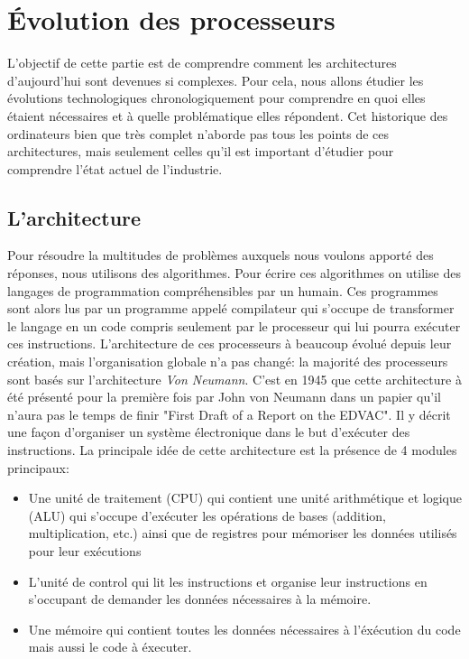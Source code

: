 \section{Évolution des processeurs}

L'objectif de cette partie est de comprendre comment les architectures d'aujourd'hui sont devenues si complexes. Pour cela, nous allons étudier les évolutions technologiques chronologiquement pour comprendre en quoi elles étaient nécessaires et à quelle problématique elles répondent. Cet historique des ordinateurs bien que très complet n'aborde pas tous les points de ces architectures, mais seulement celles qu'il est important d'étudier pour comprendre l'état actuel de l'industrie.




\subsection{L'architecture}
Pour résoudre la multitudes de problèmes auxquels nous voulons apporté des réponses, nous utilisons des algorithmes. Pour écrire ces algorithmes on utilise des langages de programmation compréhensibles par un humain. Ces programmes sont alors lus par un programme appelé compilateur qui s'occupe de transformer le langage en un code compris seulement par le processeur qui lui pourra exécuter ces instructions. L'architecture de ces processeurs à beaucoup évolué depuis leur création, mais l'organisation globale n'a pas changé: la majorité des processeurs sont basés sur l'architecture \textit{Von Neumann}. C'est en 1945 que cette architecture à été présenté pour la première fois par John von Neumann dans un papier qu'il n'aura pas le temps de finir "First Draft of a Report on the EDVAC". Il y décrit une façon d'organiser un système électronique dans le but d'exécuter des instructions. La principale idée de cette architecture est la présence de 4 modules principaux:
 \begin{itemize}
    \item Une unité de traitement (CPU) qui contient une unité arithmétique et logique (ALU) qui s'occupe d'exécuter les opérations de bases (addition, multiplication, etc.) ainsi que de registres pour mémoriser les données utilisés pour leur exécutions
    \item L'unité de control qui lit les instructions et organise leur instructions en s'occupant de demander les données nécessaires à la mémoire.
    \item Une mémoire qui contient toutes les données nécessaires à l'éxécution du code mais aussi le code à éxecuter.
 \end{itemize}
 

